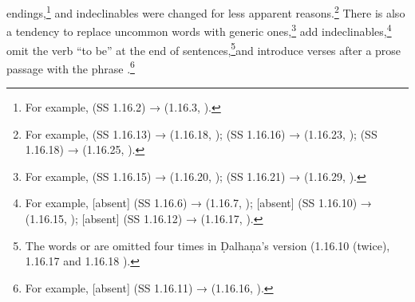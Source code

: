                                 endings,\footnote{For
                                    example,  (SS 1.16.2) →  (1.16.3, 
                                    \cite[76]{vulgate}).} and
                                    indeclinables were changed for less apparent 
                                    reasons.\footnote{For example,
                                         (SS 1.16.13) →  (1.16.18, \cite[79]{vulgate}); 
                                        (SS 1.16.16) →  (1.16.23, \cite[79]{vulgate});  
                                        (SS 1.16.18) →
                                         (1.16.25, \cite[80]{vulgate}).} There is also a 
                                        tendency to replace
                                        uncommon words with generic ones,\footnote{For example, 
                                            (SS 1.16.15) →  (1.16.20, \cite[79]{vulgate}); 
                                            (SS 1.16.21) →  (1.16.29, \cite[81]{vulgate}).} 
                                            add
                                            indeclinables,\footnote{For example, [absent] (SS 1.16.6) → 
                                             (1.16.7,
                                                \cite[77]{vulgate}); [absent] (SS 1.16.10) →  
                                                (1.16.15,
                                                \cite[78]{vulgate}); [absent] (SS 1.16.12) →  
                                                (1.16.17,
                                                \cite[79]{vulgate}).} omit the verb “to be” at the end of 
                                                sentences,\footnote{The
                                                    words  or  are omitted four 
                                                    times in Ḍalhaṇa's version
                                                    (1.16.10 (twice), 1.16.17 and 1.16.18 \citep[77, 
                                                    79]{vulgate}).}and introduce
                                                    verses after a prose passage with the phrase 
                                                    .\footnote{For
                                                        example, [absent] (SS 1.16.11) →  
                                                        (1.16.16,
                                                        \cite[79]{vulgate}).}

